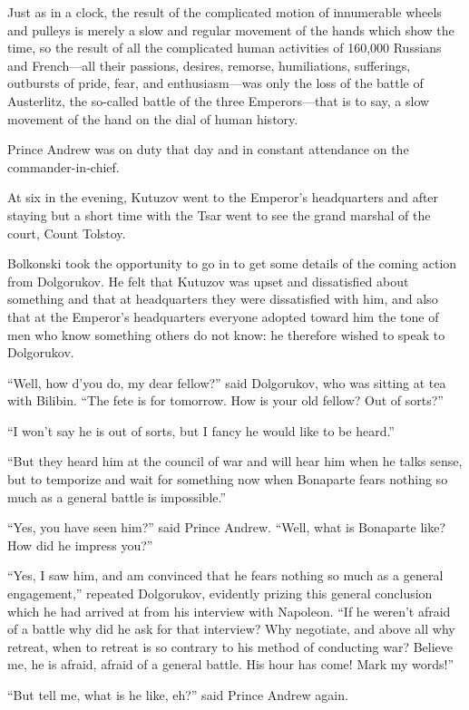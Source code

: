 Just as in a clock, the result of the complicated motion of
innumerable wheels and pulleys is merely a slow and regular
movement of the hands which show the time, so the result of all
the complicated human activities of 160,000 Russians and
French---all their passions, desires, remorse, humiliations,
sufferings, outbursts of pride, fear, and enthusiasm---was only
the loss of the battle of Austerlitz, the so-called battle of the
three Emperors---that is to say, a slow movement of the hand on
the dial of human history.

Prince Andrew was on duty that day and in constant attendance on
the commander-in-chief.

At six in the evening, Kutuzov went to the Emperor's headquarters
and after staying but a short time with the Tsar went to see the
grand marshal of the court, Count Tolstoy.

Bolkonski took the opportunity to go in to get some details of
the coming action from Dolgorukov. He felt that Kutuzov was upset
and dissatisfied about something and that at headquarters they
were dissatisfied with him, and also that at the Emperor's
headquarters everyone adopted toward him the tone of men who know
something others do not know: he therefore wished to speak to
Dolgorukov.

``Well, how d'you do, my dear fellow?'' said Dolgorukov, who was
sitting at tea with Bilibin. ``The fete is for tomorrow. How is
your old fellow?  Out of sorts?''

``I won't say he is out of sorts, but I fancy he would like to be
heard.''

``But they heard him at the council of war and will hear him when
he talks sense, but to temporize and wait for something now when
Bonaparte fears nothing so much as a general battle is
impossible.''

``Yes, you have seen him?'' said Prince Andrew. ``Well, what is
Bonaparte like? How did he impress you?''

``Yes, I saw him, and am convinced that he fears nothing so much
as a general engagement,'' repeated Dolgorukov, evidently prizing
this general conclusion which he had arrived at from his
interview with Napoleon. ``If he weren't afraid of a battle why
did he ask for that interview? Why negotiate, and above all why
retreat, when to retreat is so contrary to his method of
conducting war? Believe me, he is afraid, afraid of a general
battle. His hour has come! Mark my words!''

``But tell me, what is he like, eh?'' said Prince Andrew again.

